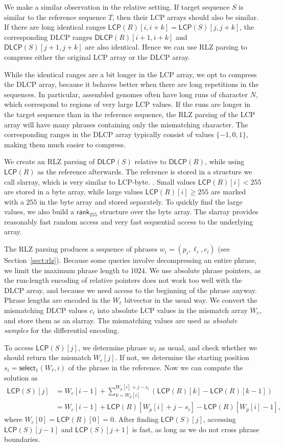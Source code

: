 \documentclass[a4paper,11pt]{llncs}
\newcommand{\set}[1]{\ensuremath{\{ #1 \}}}
\newcommand{\LCP}{\textsf{LCP}}
\newcommand{\DLCP}{\textsf{DLCP}}
\newcommand{\LCPbyte}{\textsf{LCP\nobreakdash-byte}}
\newcommand{\mLCP}{\ensuremath{\mathsf{LCP}}}
\newcommand{\mDLCP}{\ensuremath{\mathsf{DLCP}}}
\newcommand{\RLZ}{\textsf{RLZ}}
\newcommand{\slarray}{\textsf{slarray}}
\newcommand{\mrank}{\ensuremath{\mathsf{rank}}}
\newcommand{\mselect}{\ensuremath{\mathsf{select}}}
\begin{document}
We make a similar observation in the relative setting. If target sequence $S$ is similar to the reference sequence $T$, then their \LCP{} arrays should also be similar. If there are long identical ranges $\mLCP(R)[i,i+k] = \mLCP(S)[j,j+k]$, the corresponding \DLCP{} ranges $\mDLCP(R)[i+1,i+k]$ and $\mDLCP(S)[j+1,j+k]$ are also identical. Hence we can use \RLZ{} parsing to compress either the original \LCP{} array or the \DLCP{} array.

While the identical ranges are a bit longer in the \LCP{} array, we opt to compress the \DLCP{} array, because it behaves better when there are long repetitions in the sequences. In particular, assembled genomes often have long runs of character $N$, which correspond to regions of very large \LCP{} values. If the runs are longer in the target sequence than in the reference sequence, the \RLZ{} parsing of the \LCP{} array will have many phrases containing only the mismatching character. The corresponding ranges in the \DLCP{} array typically consist of values $\set{-1, 0, 1}$, making them much easier to compress.

We create an \RLZ{} parsing of $\mDLCP(S)$ relative to $\mDLCP(R)$, while using $\mLCP(R)$ as the reference afterwards. The reference is stored in a structure we call \slarray, which is very similar to \LCPbyte. \cite{Abouelhoda2004}. Small values $\mLCP(R)[i] < 255$ are stored in a byte array, while large values $\mLCP(R)[i] \ge 255$ are marked with a $255$ in the byte array and stored separately. To quickly find the large values, we also build a $\mrank_{255}$ structure over the byte array. The \slarray{} provides reasonably fast random access and very fast sequential access to the underlying array.

The \RLZ{} parsing produces a sequence of phrases $w_{i} = (p_{i}, \ell_{i}, c_{i})$ (see Section~\ref{sect:rlz}). Because some queries involve decompressing an entire phrase, we limit the maximum phrase length to $1024$. We use absolute phrase pointers, as the run-length encoding of relative pointers does not work too well with the \DLCP{} array, and because we need access to the beginning of the phrase anyway. Phrase lengths are encoded in the $W_{\ell}$ bitvector in the usual way. We convert the mismatching \DLCP{} values $c_{i}$ into absolute \LCP{} values in the mismatch array $W_{c}$, and store them as an \slarray. The mismatching values are used as \emph{absolute samples} for the differential encoding.

To access $\mLCP(S)[j]$, we determine phrase $w_{i}$ as usual, and check whether we should return the mismatch $W_{c}[j]$. If not, we determine the starting position $s_{i} = \mselect_{1}(W_{\ell}, i)$ of the phrase in the reference. Now we can compute the solution as
\begin{align*}
\mLCP(S)[j] &= W_{c}[i-1] + \sum_{k = W_{p}[i]}^{W_{p}[i]+j-s_{i}} (\mLCP(R)[k] - \mLCP(R)[k-1]) \\
&= W_{c}[i-1] + \mLCP(R)[W_{p}[i]+j-s_{i}] - \mLCP(R)[W_{p}[i]-1],
\end{align*}
where $W_{c}[0] = \mLCP(R)[0] = 0$. After finding $\mLCP(S)[j]$, accessing $\mLCP(S)[j-1]$ and $\mLCP(S)[j+1]$ is fast, as long as we do not cross phrase boundaries.
\end{document}
